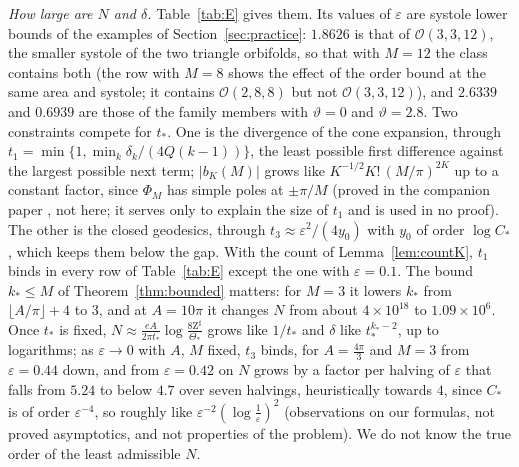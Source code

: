 \documentclass[pdflatex,sn-mathphys-num]{sn-jnl}
\theoremstyle{thmstyleone}%
\theoremstyle{thmstylethree}%
\newcommand{\Orb}{\mathcal{O}}
\newcommand{\cZ}{\mathrm{Z}}
\begin{document}
\emph{How large are $N$ and $\delta$.} Table~\ref{tab:E} gives them. Its values of $\varepsilon$ are systole lower bounds of the examples of Section~\ref{sec:practice}: $1.8626$ is that of $\Orb(3,3,12)$, the smaller systole of the two triangle orbifolds, so that with $M=12$ the class contains both (the row with $M=8$ shows the effect of the order bound at the same area and systole; it contains $\Orb(2,8,8)$ but not $\Orb(3,3,12)$), and $2.6339$ and $0.6939$ are those of the family members with $\vartheta=0$ and $\vartheta=2.8$. Two constraints compete for $t_*$. One is the divergence of the cone expansion, through $t_1=\min\{1,\min_k\delta_k/(4Q(k-1))\}$, the least possible first difference against the largest possible next term; $|b_K(M)|$ grows like $K^{-1/2}K!\,(M/\pi)^{2K}$ up to a constant factor, since $\Phi_M$ has simple poles at $\pm\pi/M$ (proved in the companion paper \cite[Lemma~\ref*{A-lem:growth}]{companionA}, not here; it serves only to explain the size of $t_1$ and is used in no proof). The other is the closed geodesics, through $t_3\approx\varepsilon^2/(4y_0)$ with $y_0$ of order $\log C_*$, which keeps them below the gap. With the count of Lemma~\ref{lem:countK}, $t_1$ binds in every row of Table~\ref{tab:E} except the one with $\varepsilon=0.1$. The bound $k_*\le M$ of Theorem~\ref{thm:bounded} matters: for $M=3$ it lowers $k_*$ from $\lfloor A/\pi\rfloor+4$ to $3$, and at $A=10\pi$ it changes $N$ from about $4\times10^{18}$ to $1.09\times10^6$. Once $t_*$ is fixed, $N\approx\frac{eA}{2\pi t_*}\log\frac{8\cZ^\sharp}{\Theta_*}$ grows like $1/t_*$ and $\delta$ like $t_*^{k_*-2}$, up to logarithms; as $\varepsilon\to0$ with $A$, $M$ fixed, $t_3$ binds, for $A=\frac{4\pi}3$ and $M=3$ from $\varepsilon=0.44$ down, and from $\varepsilon=0.42$ on $N$ grows by a factor per halving of $\varepsilon$ that falls from $5.24$ to below $4.7$ over seven halvings, heuristically towards $4$, since $C_*$ is of order $\varepsilon^{-4}$, so roughly like $\varepsilon^{-2}(\log\frac1\varepsilon)^2$ (observations on our formulas, not proved asymptotics, and not properties of the problem). We do not know the true order of the least admissible $N$.
\end{document}
